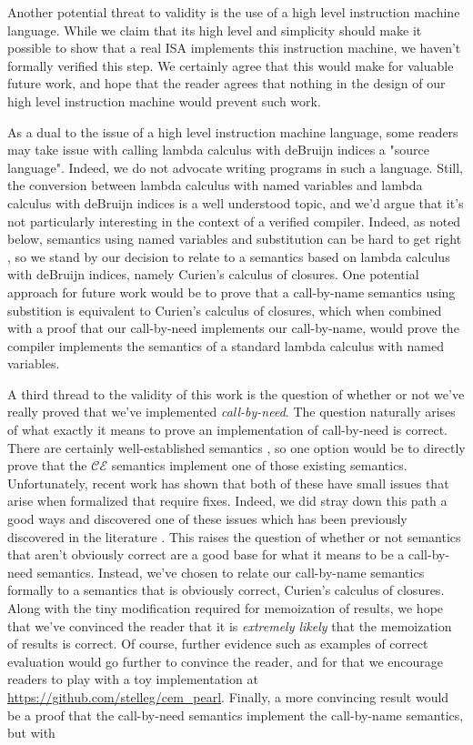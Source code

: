 Another potential threat to validity is the use of a high level instruction
machine language. While we claim that its high level and simplicity should make
it possible to show that a real ISA implements this instruction machine, we
haven't formally verified this step. We certainly agree that this would make for
valuable future work, and hope that the reader agrees that nothing in the design
of our high level instruction machine would prevent such work.

As a dual to the issue of a high level instruction machine language, some
readers may take issue with calling lambda calculus with deBruijn indices a
"source language". Indeed, we do not advocate writing programs in such a
language. Still, the conversion between lambda calculus with named variables and
lambda calculus with deBruijn indices is a well understood topic, and we'd argue
that it's not particularly interesting in the context of a verified compiler.
Indeed, as noted below, semantics using named variables and substitution can be
hard to get right \cite{launchbury_formal_breitner, japanese_cbn}, so we stand
by our decision to relate to a semantics based on lambda calculus with deBruijn
indices, namely Curien's calculus of closures. One potential approach for future
work would be to prove that a call-by-name semantics using substition is
equivalent to Curien's calculus of closures, which when combined with a proof
that our call-by-need implements our call-by-name, would prove the compiler
implements the semantics of a standard lambda calculus with named variables.

A third thread to the validity of this work is the question of whether or not
we've really proved that we've implemented \emph{call-by-need}. The question
naturally arises of what exactly it means to prove an implementation of
call-by-need is correct. There are certainly well-established semantics
\cite{launchbury, ariola}, so one option would be to directly prove that the
$\mathcal{CE}$ semantics implement one of those existing semantics.
Unfortunately, recent work has shown that both of these have small issues that
arise when formalized that require fixes. Indeed, we did stray down this path a
good ways and discovered one of these issues which has been previously
discovered in the literature \cite{japanese_cbn}. This raises the question of
whether or not semantics that aren't obviously correct are a good base for what
it means to be a call-by-need semantics. Instead, we've chosen to relate our
call-by-name semantics formally to a semantics that is obviously correct,
Curien's calculus of closures. Along with the tiny modification required for
memoization of results, we hope that we've convinced the reader that it is
\emph{extremely likely} that the memoization of results is correct. Of course,
further evidence such as examples of correct evaluation would go further to
convince the reader, and for that we encourage readers to
play with a toy implementation at \url{https://github.com/stelleg/cem\_pearl}.
Finally, a more convincing result would be a proof that the call-by-need
semantics implement the call-by-name semantics, but with  

